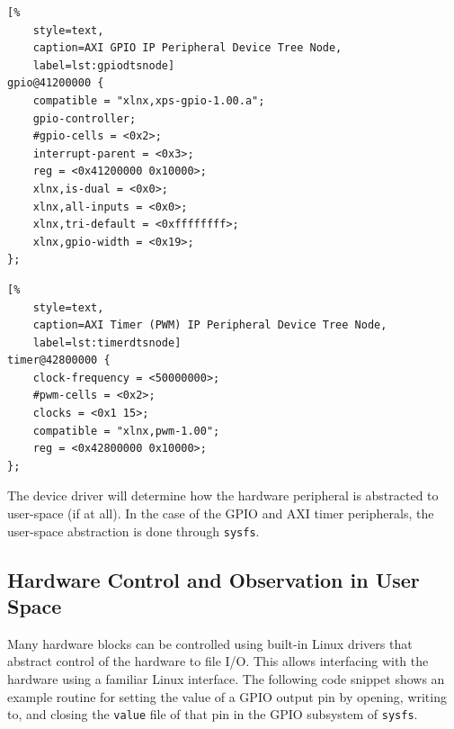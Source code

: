 \begin{lstlisting}[%
	style=text,
	caption=AXI GPIO IP Peripheral Device Tree Node,
	label=lst:gpiodtsnode]
gpio@41200000 {
	compatible = "xlnx,xps-gpio-1.00.a";
	gpio-controller;
	#gpio-cells = <0x2>;
	interrupt-parent = <0x3>;
	reg = <0x41200000 0x10000>;
	xlnx,is-dual = <0x0>;
	xlnx,all-inputs = <0x0>;
	xlnx,tri-default = <0xffffffff>;
	xlnx,gpio-width = <0x19>;
};
\end{lstlisting}

\begin{lstlisting}[%
	style=text,
	caption=AXI Timer (PWM) IP Peripheral Device Tree Node,
	label=lst:timerdtsnode]
timer@42800000 {
	clock-frequency = <50000000>;
	#pwm-cells = <0x2>;
	clocks = <0x1 15>;
	compatible = "xlnx,pwm-1.00";
	reg = <0x42800000 0x10000>;
};
\end{lstlisting}


The device driver will determine how the hardware peripheral is abstracted to user-space (if at all). In the case of the GPIO and AXI timer peripherals, the user-space abstraction is done through \texttt{sysfs}.


\subsection{Hardware Control and Observation in User Space}

Many hardware blocks can be controlled using built-in Linux drivers that abstract control of the hardware to file I/O. This allows interfacing with the hardware using a familiar Linux interface. The following code snippet shows an example routine for setting the value of a GPIO output pin by opening, writing to, and closing the \texttt{value} file of that pin in the GPIO subsystem of \texttt{sysfs}. 


